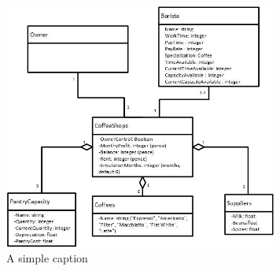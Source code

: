\documentclass[12pt]{article}
\begin{document}

\begin{figure}[ht!]
\centering
\includegraphics[width=90mm]{UML.jpg}
\caption{A simple caption \label{fig:example}}
\end{figure}


\printbibliography
\end{document}
